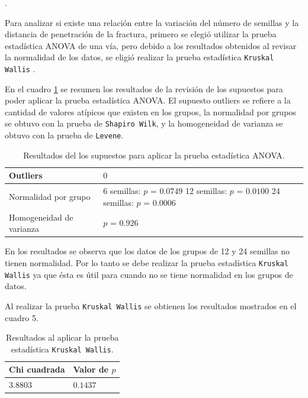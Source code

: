 \documentclass{article}
\begin{document}
\newpage
.
\bigskip

Para analizar si existe una relación entre la variación del número de semillas y la distancia de penetración de la fractura, primero se elegió utilizar la prueba estadística ANOVA de una vía, pero debido a los resultados obtenidos al revisar la normalidad de los datos, se eligió realizar la prueba estadística \texttt{Kruskal Wallis} \citep{2}.
\bigskip

En el cuadro \ref{Cuadro 4} se  resumen los resultados de la revisión de los supuestos para poder aplicar la prueba estadística ANOVA. El supuesto outliers se refiere a la cantidad de valores atípicos que existen en los grupos, la normalidad por grupos se obtuvo con la prueba de \texttt{Shapiro Wilk}, y la homogeneidad de varianza se obtuvo con la prueba de \texttt{Levene}.

\begin{table}[ht]
\centering
\caption{Resultados del los supuestos para aplicar la prueba estadística ANOVA.}
\smallskip

\begin{tabular}{ |p{2.1cm}|p{3.5cm}|}
 \hline
 Outliers & $0$ \\
 \hline
 Normalidad por grupo & 6 semillas: $p$ = $0.0749$ 12 semillas: $p$ = $0.0100$ 24 semillas: $p$ = $0.0006$ \\
 \hline
 Homogeneidad de varianza & $p$ = $0.926$ \\
 \hline
\end{tabular}
\label{Cuadro 4}
\end{table}

En los resultados se observa que los datos de los grupos de 12 y 24 semillas no tienen normalidad. Por lo tanto se debe realizar la prueba estadística \texttt{Kruskal Wallis} ya que ésta es útil para cuando no se tiene normalidad en los grupos de datos.
\bigskip

Al realizar la prueba \texttt{Kruskal Wallis} se obtienen los resultados mostrados en el cuadro 5.

\begin{table}[ht]
\centering
\caption{Resultados al aplicar la prueba estadística \texttt{Kruskal Wallis}.}
\smallskip

\begin{tabular}{ |p{2.1cm}|p{2.1cm}|}
 \hline
 Chi cuadrada & Valor de $p$ \\
 \hline
 $3.8803$ & $0.1437$ \\
 \hline
\end{tabular}
\label{Cuadro 5}
\end{table}
\end{document}
